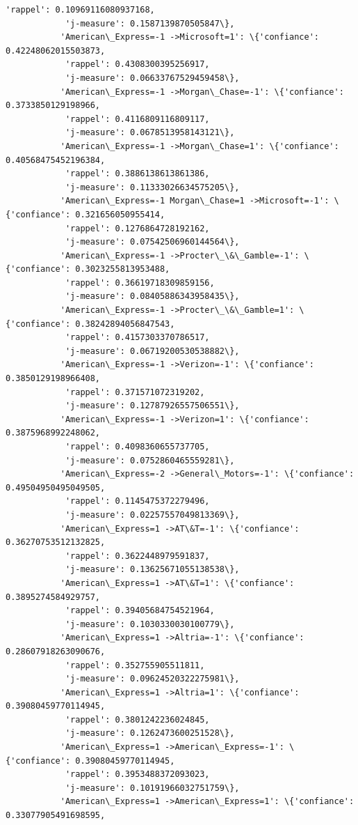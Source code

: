 \documentclass[11pt]{article}
\begin{document}
\begin{Verbatim}[commandchars=\\\{\}]
            'rappel': 0.10969116080937168,
            'j-measure': 0.1587139870505847\},
           'American\_Express=-1 ->Microsoft=1': \{'confiance': 0.42248062015503873,
            'rappel': 0.4308300395256917,
            'j-measure': 0.06633767529459458\},
           'American\_Express=-1 ->Morgan\_Chase=-1': \{'confiance': 0.3733850129198966,
            'rappel': 0.4116809116809117,
            'j-measure': 0.0678513958143121\},
           'American\_Express=-1 ->Morgan\_Chase=1': \{'confiance': 0.40568475452196384,
            'rappel': 0.3886138613861386,
            'j-measure': 0.11333026634575205\},
           'American\_Express=-1 Morgan\_Chase=1 ->Microsoft=-1': \{'confiance': 0.321656050955414,
            'rappel': 0.1276864728192162,
            'j-measure': 0.07542506960144564\},
           'American\_Express=-1 ->Procter\_\&\_Gamble=-1': \{'confiance': 0.3023255813953488,
            'rappel': 0.36619718309859156,
            'j-measure': 0.08405886343958435\},
           'American\_Express=-1 ->Procter\_\&\_Gamble=1': \{'confiance': 0.38242894056847543,
            'rappel': 0.4157303370786517,
            'j-measure': 0.06719200530538882\},
           'American\_Express=-1 ->Verizon=-1': \{'confiance': 0.3850129198966408,
            'rappel': 0.371571072319202,
            'j-measure': 0.12787926557506551\},
           'American\_Express=-1 ->Verizon=1': \{'confiance': 0.3875968992248062,
            'rappel': 0.4098360655737705,
            'j-measure': 0.0752860465559281\},
           'American\_Express=-2 ->General\_Motors=-1': \{'confiance': 0.49504950495049505,
            'rappel': 0.1145475372279496,
            'j-measure': 0.02257557049813369\},
           'American\_Express=1 ->AT\&T=-1': \{'confiance': 0.36270753512132825,
            'rappel': 0.3622448979591837,
            'j-measure': 0.13625671055138538\},
           'American\_Express=1 ->AT\&T=1': \{'confiance': 0.3895274584929757,
            'rappel': 0.39405684754521964,
            'j-measure': 0.1030330030100779\},
           'American\_Express=1 ->Altria=-1': \{'confiance': 0.28607918263090676,
            'rappel': 0.352755905511811,
            'j-measure': 0.09624520322275981\},
           'American\_Express=1 ->Altria=1': \{'confiance': 0.39080459770114945,
            'rappel': 0.3801242236024845,
            'j-measure': 0.1262473600251528\},
           'American\_Express=1 ->American\_Express=-1': \{'confiance': 0.39080459770114945,
            'rappel': 0.3953488372093023,
            'j-measure': 0.10191966032751759\},
           'American\_Express=1 ->American\_Express=1': \{'confiance': 0.33077905491698595,

\end{Verbatim}
\end{document}
